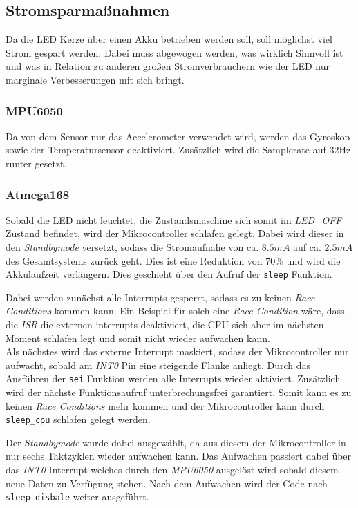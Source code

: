 \subsection{Stromsparmaßnahmen}
    Da die LED Kerze über einen Akku betrieben werden soll, soll möglichst viel
    Strom gespart werden. Dabei muss abgewogen werden, was wirklich Sinnvoll ist
    und was in Relation zu anderen großen Stromverbrauchern wie der LED nur
    marginale Verbesserungen mit sich bringt.

    \subsubsection{MPU6050}
        Da von dem Sensor nur das Accelerometer verwendet wird, werden das
        Gyroskop sowie der Temperatursensor deaktiviert. Zusätzlich wird die
        Samplerate auf 32Hz runter gesetzt.

    \subsubsection{Atmega168}
        Sobald die LED nicht leuchtet, die Zustandsmaschine sich somit im
        \textit{LED\_OFF} Zustand befindet, wird der Mikrocontroller schlafen
        gelegt. Dabei wird dieser in den \textit{Standbymode} versetzt, sodass
        die Stromaufnahe von ca. $8.5mA$ auf ca. $2.5mA$ des Gesamtsystems zurück
        geht. Dies ist eine Reduktion von $70\%$ und wird die Akkulaufzeit
        verlängern.
        Dies geschieht über den Aufruf der \texttt{sleep} Funktion.

        
        Dabei werden zunächst alle Interrupts gesperrt, sodass es zu keinen
        \textit{Race Conditions} kommen kann. Ein Beispiel für solch eine
        \textit{Race Condition} wäre, dass die \textit{ISR} die externen
        interrupts deaktiviert, die CPU sich aber im nächsten Moment schlafen legt
        und somit nicht wieder aufwachen kann.\\
        Als nächstes wird das externe Interrupt maskiert, sodass der
        Mikrocontroller nur aufwacht, sobald am \textit{INT0} Pin eine
        steigende Flanke anliegt.
        Durch das Ausführen der \texttt{sei} Funktion werden alle Interrupts wieder aktiviert.
        Zusätzlich wird der nächste Funktionsaufruf unterbrechungsfrei garantiert.
        Somit kann es zu keinen \textit{Race Conditions} mehr kommen und der
        Mikrocontroller kann durch \texttt{sleep\_cpu} schlafen gelegt werden.

        
        Der \textit{Standbymode} wurde dabei ausgewählt, da aus diesem
        der Mikrocontroller in nur sechs Taktzyklen wieder aufwachen kann.
        Das Aufwachen passiert dabei über das \textit{INT0} Interrupt welches
        durch den \textit{MPU6050} ausgelöst wird sobald diesem neue Daten zu
        Verfügung stehen.
        Nach dem Aufwachen wird der Code nach \texttt{sleep\_disbale}
        weiter ausgeführt.

